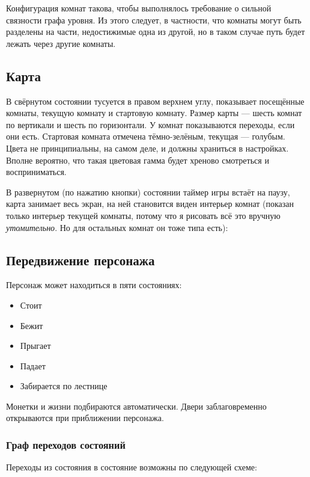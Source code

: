 \documentclass[12pt,a4paper,fullpage]{article}
\begin{document}
Конфигурация комнат такова, чтобы выполнялось требование о сильной связности графа уровня. Из этого следует, в частности, что комнаты могут быть разделены на части, недостижимые одна из другой, но в таком случае путь будет лежать через другие комнаты.\\

\subsection{Карта}
В свёрнутом состоянии тусуется в правом верхнем углу, показывает посещённые комнаты, текущую комнату и стартовую комнату. Размер карты --- шесть комнат по вертикали и шесть по горизонтали. У комнат показываются переходы, если они есть. Стартовая комната отмечена тёмно-зелёным, текущая --- голубым. Цвета не принципиальны, на самом деле, и должны храниться в настройках. Вполне вероятно, что такая цветовая гамма будет хреново смотреться и восприниматься.\\

В развернутом (по нажатию кнопки) состоянии таймер игры встаёт на паузу, карта занимает весь экран, на ней становится виден интерьер комнат (показан только интерьер текущей комнаты, потому что я рисовать всё это вручную \textit{утомительно}. Но для остальных комнат он тоже типа есть):\\

\subsection{Передвижение персонажа}
Персонаж может находиться в пяти состояниях:
\begin{itemize}
\item Стоит
\item Бежит
\item Прыгает
\item Падает
\item Забирается по лестнице
\end{itemize}
Монетки и жизни подбираются автоматически. Двери заблаговременно открываются при приближении персонажа.\\

\subsubsection{Граф переходов состояний}
Переходы из состояния в состояние возможны по следующей схеме:\\
\end{document}
